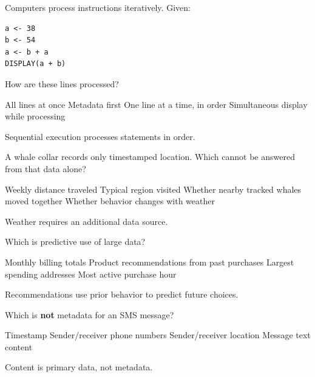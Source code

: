

\question[5]
Computers process instructions iteratively. Given:
\begin{lstlisting}[style=pseudo]
a <- 38
b <- 54
a <- b + a
DISPLAY(a + b)
\end{lstlisting}
How are these lines processed?
\begin{choices}
  \choice All lines at once
  \choice Metadata first
  \CorrectChoice One line at a time, in order
  \choice Simultaneous display while processing
\end{choices}
\begin{solution}
  Sequential execution processes statements in order.
\end{solution}

\question[5]
A whale collar records only timestamped location. Which cannot be answered from that data alone?
\begin{choices}
  \choice Weekly distance traveled
  \choice Typical region visited
  \choice Whether nearby tracked whales moved together
  \CorrectChoice Whether behavior changes with weather
\end{choices}
\begin{solution}
  Weather requires an additional data source.
\end{solution}

\question[5]
Which is predictive use of large data?
\begin{choices}
  \choice Monthly billing totals
  \CorrectChoice Product recommendations from past purchases
  \choice Largest spending addresses
  \choice Most active purchase hour
\end{choices}
\begin{solution}
  Recommendations use prior behavior to predict future choices.
\end{solution}

\question[5]
Which is \textbf{not} metadata for an SMS message?
\begin{choices}
  \choice Timestamp
  \choice Sender/receiver phone numbers
  \choice Sender/receiver location
  \CorrectChoice Message text content
\end{choices}
\begin{solution}
  Content is primary data, not metadata.
\end{solution}

\newpage 

